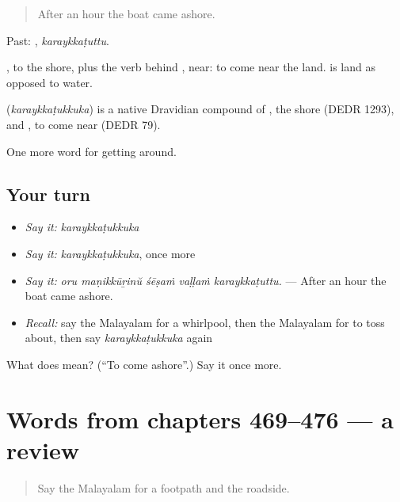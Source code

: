 \begin{quote}
After an hour the boat came ashore.
\end{quote}

Past: , \emph{karaykkaṭuttu}.

, to the shore, plus the verb behind , near: to come near the land.  is land as opposed to water.

\begin{cousinweb}
\textbf{} (\emph{karaykkaṭukkuka}) is a native Dravidian compound of , the shore (DEDR 1293), and , to come near (DEDR 79).
\end{cousinweb}

\begin{grammarlens}[title={What you've built}]
One more word for getting around.
\end{grammarlens}

\subsection*{Your turn}
\begin{itemize}
\raggedright
  \item \emph{Say it:} \emph{karaykkaṭukkuka}
  \item \emph{Say it:} \emph{karaykkaṭukkuka}, once more
  \item \emph{Say it:} \emph{oru maṇikkūṟinŭ śēṣaṁ vaḷḷaṁ karaykkaṭuttu.} — After an hour the boat came ashore.
  \item \emph{Recall:} say the Malayalam for a whirlpool, then the Malayalam for to toss about, then say \emph{karaykkaṭukkuka} again
\end{itemize}

\begin{tcolorbox}[breakable,colback=teal!4,colframe=teal!35!black,title={Before you move on}]
What does  mean? (\textquotedblleft{}To come ashore\textquotedblright{}.) Say it once more.
\end{tcolorbox}
\section[(dialogue)]{Words from chapters 469–476 — a review}

\label{lesson:ML-R476-review-469-476}



\begin{quote}
Say the Malayalam for a footpath and the roadside.
\end{quote}

